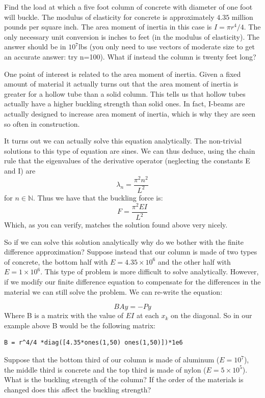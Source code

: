 \begin{problem}
Find the load at which a five foot column of concrete with diameter of one foot will buckle. The modulus of elasticity for concrete is approximately $4.35$ million pounds per square inch. The area moment of inertia in this case is $I = \pi r^4/4$. The only necessary unit conversion is inches to feet (in the modulus of elasticity). The answer should be in $10^7$lbs (you only need to use vectors of moderate size to get an accurate answer: try n=100). What if instead the column is twenty feet long?
\end{problem}

One point of interest is related to the area moment of inertia. Given a fixed amount of material it actually turns out that the area moment of inertia is greater for a hollow tube than a solid column. This tells us that hollow tubes actually have a higher buckling strength than solid ones. In fact, I-beams are actually designed to increase area moment of inertia, which is why they are seen so often in construction.

It turns out we can actually solve this equation analytically. The non-trivial solutions to this type of equation are sines. We can thus deduce, using the chain rule that the eigenvalues of the derivative operator (neglecting the constants E and I) are
\[
\lambda_n = \frac{\pi^2 n^2}{L^2}
\]
for $n \in \mathbb{N}$. Thus we have that the buckling force is:
\[
F = \frac{\pi^2 EI}{L^2}
\]
Which, as you can verify, matches the solution found above very nicely.

So if we can solve this solution analytically why do we bother with the finite difference approximation? Suppose instead that our column is made of two types of concrete, the bottom half with $E = 4.35\times 10^6$ and the other half with$E = 1 \times 10^6$. This type of problem is more difficult to solve analytically. However, if we modify our finite difference equation to compensate for the differences in the material we can still solve the problem. We can re-write the equation:

\[
B A y = -Py
\]
Where B is a matrix with the value of $E I$ at each $x_k$ on the diagonal. So in our example above B would be the following matrix:

\begin{verbatim}
B = r^4/4 *diag([4.35*ones(1,50) ones(1,50)])*1e6
\end{verbatim}

\begin{problem}
Suppose that the bottom third of our column is made of aluminum ($E = 10^7$), the middle third is concrete and the top third is made of nylon ($E = 5\times 10^5$). What is the buckling strength of the column? If the order of the materials is changed does this affect the buckling strength?
\end{problem}



